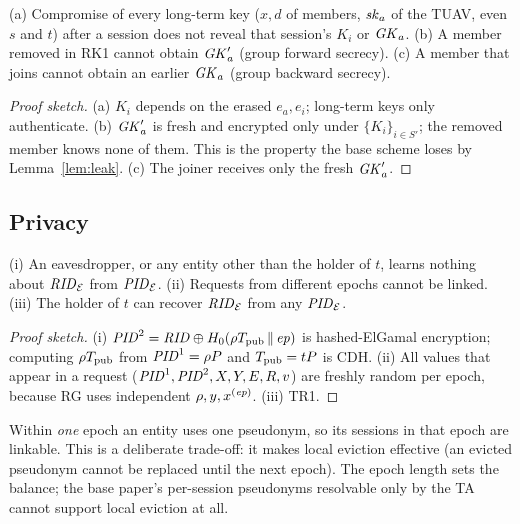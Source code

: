 \begin{theorem}\label{thm:fs}
(a) Compromise of every long-term key ($x,d$ of members, $\mathit{sk}_a$ of the TUAV, even $s$ and $t$) after a session does not reveal that session's $K_i$ or $\mathit{GK}_a$.
(b) A member removed in RK1 cannot obtain $\mathit{GK}'_a$ (group forward secrecy). (c) A member that joins cannot obtain an earlier $\mathit{GK}_a$ (group backward secrecy).
\end{theorem}
\begin{proof}[Proof sketch]
(a) $K_i$ depends on the erased $e_a,e_i$; long-term keys only authenticate. (b) $\mathit{GK}'_a$ is fresh and encrypted only under $\{K_i\}_{i\in S'}$; the removed
member knows none of them. This is the property the base scheme loses by Lemma~\ref{lem:leak}. (c) The joiner receives only the fresh $\mathit{GK}'_a$.
\end{proof}

\subsection{Privacy}
\begin{theorem}\label{thm:priv}
(i) An eavesdropper, or any entity other than the holder of $t$, learns nothing about $\mathit{RID}_{\mathcal{E}}$ from $\mathit{PID}_{\mathcal{E}}$. (ii) Requests from different epochs cannot be linked.
(iii) The holder of $t$ can recover $\mathit{RID}_{\mathcal{E}}$ from any $\mathit{PID}_{\mathcal{E}}$.
\end{theorem}
\begin{proof}[Proof sketch]
(i) $\mathit{PID}^2=\mathit{RID}\oplus H_0(\rho T_{\mathrm{pub}}\,\|\,\mathit{ep})$ is hashed-ElGamal encryption; computing $\rho T_{\mathrm{pub}}$ from $\mathit{PID}^1=\rho P$ and $T_{\mathrm{pub}}=tP$ is CDH. (ii) All
values that appear in a request ($\mathit{PID}^1,\mathit{PID}^2,X,Y,E,R,v$) are freshly random per epoch, because RG uses independent $\rho,y,x^{(\mathit{ep})}$. (iii) TR1.
\end{proof}
\begin{limitbox}
Within \emph{one} epoch an entity uses one pseudonym, so its sessions in that epoch are linkable. This is a deliberate trade-off: it makes local
eviction effective (an evicted pseudonym cannot be replaced until the next epoch). The epoch length sets the balance; the base paper's per-session pseudonyms
resolvable only by the TA cannot support local eviction at all.
\end{limitbox}

